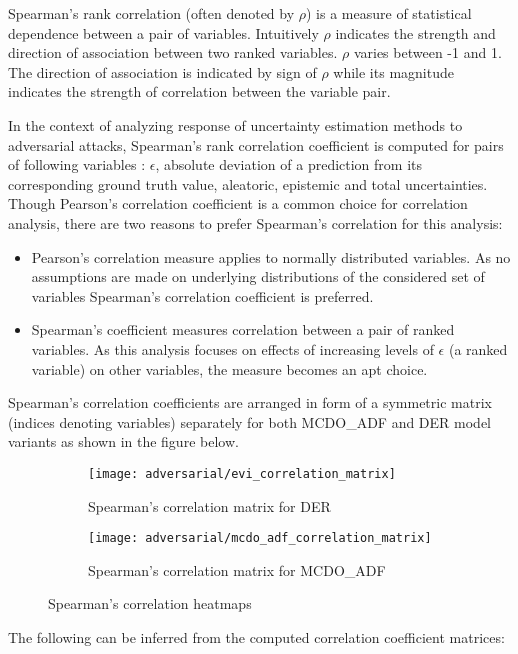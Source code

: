 Spearman's rank correlation (often denoted by $\rho$) is a measure of statistical dependence between a pair of variables. Intuitively $\rho$ indicates the strength and direction of association between two ranked variables. $\rho$ varies between -1 and 1. The direction of association is indicated by sign of $\rho$ while its magnitude indicates the strength of correlation between the variable pair.

In the context of analyzing response of uncertainty estimation methods to adversarial attacks, Spearman's rank correlation coefficient is computed for pairs of following variables : $\epsilon$, absolute deviation of a prediction from its corresponding ground truth value, aleatoric, epistemic and total uncertainties. Though Pearson's correlation coefficient is a common choice for correlation analysis, there are two reasons to prefer Spearman's correlation for this analysis:
\begin{itemize}
	\item Pearson's correlation measure applies to normally distributed variables. As no assumptions are made on underlying distributions of the considered set of variables Spearman's correlation coefficient is preferred.
	\item Spearman's coefficient measures correlation between a pair of ranked variables. As this analysis focuses on effects of increasing levels of $\epsilon$ (a ranked variable) on other variables, the measure becomes an apt choice.
\end{itemize} 
Spearman's correlation coefficients are arranged in form of a symmetric matrix (indices denoting variables) separately for both MCDO\_ADF and DER model variants as shown in the figure below.
\begin{figure}[H]
	\begin{subfigure}[b]{0.55\textwidth}
		\texttt{[image: adversarial/evi\_correlation\_matrix]}
		\caption{Spearman's correlation matrix for DER}
		\label{fig:five over x}
	\end{subfigure}
	\hfill
	\begin{subfigure}[b]{0.55\textwidth}
		\texttt{[image: adversarial/mcdo\_adf\_correlation\_matrix]}
		\caption{Spearman's correlation matrix for MCDO\_ADF}
		\label{fig:five over x}
	\end{subfigure}
	\caption{Spearman's correlation heatmaps}
	\label{fig_correlation_analysis}
\end{figure}
The following can be inferred from the computed correlation coefficient matrices:
